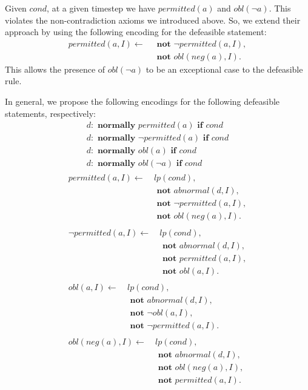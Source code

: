Given $cond$, at a given timestep we have $permitted(a)$ and $obl(\neg a)$.
This violates the non-contradiction axioms we introduced above.
So, we extend their approach by using the following encoding for the defeasible statement:
\begin{equation}
\begin{split}
    permitted(a, I) \leftarrow \
        & \textbf{ not } \neg permitted(a, I), \\
        & \textbf{ not } obl(neg(a), I).
\end{split}
\end{equation}
This allows the presence of $obl(\neg a)$ to be an exceptional case to the defeasible rule.

In general, we propose the following encodings for the following defeasible statements, respectively:
\begin{gather}
    d: \textbf{ normally } permitted(a) \textbf{ if } cond \\
    d: \textbf{ normally } \neg permitted(a) \textbf{ if } cond \\
    d: \textbf{ normally } obl(a) \textbf{ if } cond \\
    d: \textbf{ normally } obl(\neg a) \textbf{ if } cond
\end{gather}
\begin{gather}
\begin{split}
    permitted(a, I) \leftarrow \
        & lp(cond), \\
        & \textbf{ not } abnormal(d, I), \\
        & \textbf{ not } \neg permitted(a, I), \\
        & \textbf{ not } obl(neg(a), I).
\end{split} \\
\begin{split}
    \neg permitted(a, I) \leftarrow \
        & lp(cond), \\
        & \textbf{ not } abnormal(d, I), \\
        & \textbf{ not } permitted(a, I), \\
        & \textbf{ not } obl(a, I).
\end{split} \\
\begin{split}
    obl(a, I) \leftarrow \
        & lp(cond), \\
        & \textbf{ not } abnormal(d, I), \\
        & \textbf{ not } \neg obl(a, I), \\
        & \textbf{ not } \neg permitted(a, I).
\end{split} \\
\begin{split}
    obl(neg(a), I) \leftarrow \
        & lp(cond), \\
        & \textbf{ not } abnormal(d, I), \\
        & \textbf{ not } obl(neg(a), I), \\
        & \textbf{ not } permitted(a, I).
\end{split}
\end{gather}

